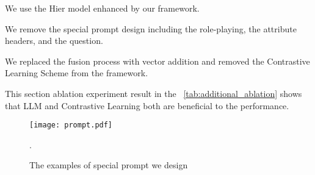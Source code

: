      We use the Hier model enhanced by our framework.
  
     We remove the special prompt design including the role-playing, the attribute headers, and the question.
    
     We replaced the fusion process with vector addition and removed the Contrastive Learning Scheme from the framework.

    This section ablation experiment result in the \tableautorefname ~\ref{tab:additional_ablation} shows that LLM and Contrastive Learning both are beneficial to the performance.

    
\begin{figure}[h]
    \centering
    \texttt{[image: prompt.pdf]} 
    \caption{The examples of special prompt we design}.  
    \label{fig: prompt}
\end{figure}